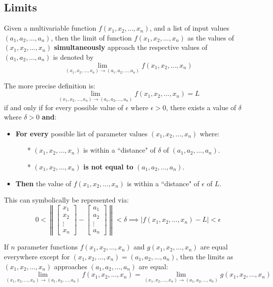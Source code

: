\documentclass{article}
\begin{document}
\subsection*{Limits}

Given a multivariable function \(f(x_1, x_2, ..., x_n)\), and a list of input values \((a_1, a_2, ..., a_n)\), then the limit of function \(f(x_1, x_2, ..., x_n)\) as the values of \((x_1, x_2, ..., x_n)\) {\bf simultaneously} approach the respective values of \((a_1, a_2, ..., a_n)\) is denoted by 
\[\lim_{(x_1, x_2, ..., x_n) \rightarrow (a_1, a_2, ..., a_n)} f(x_1, x_2, ..., x_n)\]

The more precise definition is:
\[\lim_{(x_1, x_2, ..., x_n) \rightarrow (a_1, a_2, ..., a_n)} f(x_1, x_2, ..., x_n) = L\]
if and only if for every possible value of \(\epsilon\) where \(\epsilon > 0\), there exists a value of \(\delta\) where \(\delta > 0\) {\bf and}: \\
\begin{itemize}
\item {\bf For every} possible list of parameter values \((x_1, x_2, ..., x_n)\) where: 
	\begin{itemize}
	\item[*] \((x_1, x_2, ..., x_n)\) is within a ``distance" of \(\delta\) of \((a_1, a_2, ..., a_n)\).
	\item[*] \((x_1, x_2, ..., x_n)\) {\bf is not equal to} \((a_1, a_2, ..., a_n)\). 
	\end{itemize}
\item {\bf Then} the value of \(f(x_1, x_2, ..., x_n)\) is within a ``distance" of \(\epsilon\) of \(L\). 
\end{itemize}

This can symbolically be represented via:
\[0 < \left\|\begin{bmatrix} x_1 \\ x_2 \\ \vdots \\ x_n \end{bmatrix} - \begin{bmatrix} a_1 \\ a_2 \\ \vdots \\ a_n \end{bmatrix}\right\| < \delta \implies |f(x_1, x_2, ..., x_n) - L| < \epsilon\]

\vspace{5mm}

If \(n\) parameter functions \(f(x_1, x_2, ..., x_n)\) and \(g(x_1, x_2, ..., x_n)\) are equal everywhere except for \((x_1, x_2, ..., x_n) = (a_1, a_2, ..., a_n)\), then the limits as \((x_1, x_2, ..., x_n)\) approaches \((a_1, a_2, ..., a_n)\) are equal:
\[\lim_{(x_1, x_2, ..., x_n) \rightarrow (a_1, a_2, ..., a_n)} f(x_1, x_2, ..., x_n) = \lim_{(x_1, x_2, ..., x_n) \rightarrow (a_1, a_2, ..., a_n)} g(x_1, x_2, ..., x_n)\]
\end{document}
